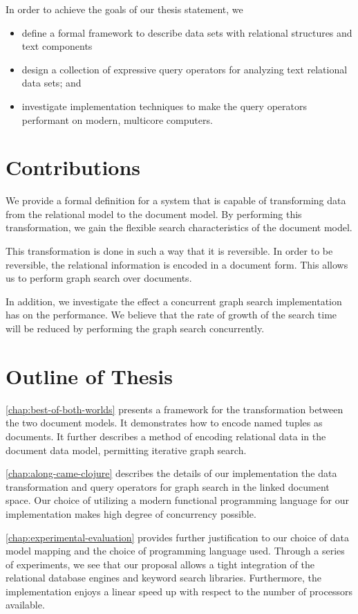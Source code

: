 		In order to achieve the goals of our thesis statement, we
		
		\begin{itemize}
			\item define a formal framework to describe data sets with relational structures and text components
			\item design a collection of expressive query operators for analyzing text relational data sets; and
			\item investigate implementation techniques to make the query operators performant on modern, multicore computers.
		\end{itemize}
		
	 \section{Contributions}
	 	We provide a formal definition for a system that is capable of transforming data from the relational model to the document model.  By performing this transformation, we gain the flexible search characteristics of the document model.
	 	
	 	This transformation is done in such a way that it is reversible.  In order to be reversible, the relational information is encoded in a document form.  This allows us to perform graph search over documents.
	 	
	 	In addition, we investigate the effect a concurrent graph search implementation has on the performance.  We believe that the rate of growth of the search time will be reduced by performing the graph search concurrently.

	
	\section{Outline of Thesis}
		\cref{chap:best-of-both-worlds} presents a framework for the transformation between the two document models.  It demonstrates how to encode named tuples as documents.  It further describes a method of encoding relational data in the document data model, permitting iterative graph search.
		
		\cref{chap:along-came-clojure} describes the details of our implementation the data transformation and query operators for graph search in the linked document space.  Our choice of utilizing a modern functional programming language for our implementation makes high degree of concurrency possible.
		
		\cref{chap:experimental-evaluation} provides further justification to our choice of data model mapping and the choice of programming language used.  Through a series of experiments, we see that our proposal allows a tight integration of the relational database engines and keyword search libraries.  Furthermore, the implementation enjoys a linear speed up with respect to the number of processors available.